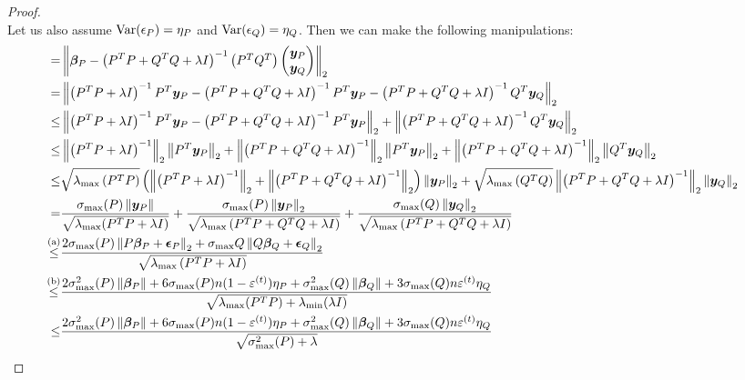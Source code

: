 \documentclass{article} %
\newcommand{\norm}[1]{\left\lVert#1\right\rVert}
\begin{document}
\begin{appendices}
\begin{proof}
\begin{equation*}
	\end{equation*}
	Let us also assume $\mathrm{Var}({\epsilon}_P) = \eta_P$ and $\mathrm{Var}({\epsilon}_Q) = \eta_Q$. Then we can make the following manipulations:
	\begin{align*}
		= &\norm{\vbeta_P - \left(P^T P + Q^T Q + \lambda I\right)^{-1}\begin{pmatrix}P^T Q^T\end{pmatrix}\begin{pmatrix}\vy_P \\ \vy_Q \end{pmatrix}}_2 &&\\
		= &\norm{\left(P^T P + \lambda I\right)^{-1} P^T \vy_P - \left(P^T P + Q^T Q + \lambda I\right)^{-1}P^T \vy_P  - \left(P^T P + Q^T Q + \lambda I\right)^{-1}Q^T \vy_Q}_2 &&\\
		\leq &\norm{\left(P^T P + \lambda I\right)^{-1} P^T \vy_P -\left(P^T P + Q^T Q+ \lambda I\right)^{-1}P^T \vy_P}_2 + \norm{\left(P^T P + Q^T Q+ \lambda I\right)^{-1}Q^T \vy_Q}_2 &&\\
		\leq& \norm{\left(P^T P + \lambda I\right)^{-1}}_2 \norm{P^T\vy_P}_2 + \norm{\left(P^T P + Q^T Q + \lambda I\right)^{-1}}_2\norm{P^T \vy_P}_2 + \norm{\left(P^T P + Q^T Q + \lambda I\right)^{-1}}_2\norm{Q^T \vy_Q}_2&&\\
		\leq & \sqrt{\lambda_{\max}\left(P^T P\right)}\left(\norm{\left(P^TP + \lambda I\right)^{-1}}_2+\norm{\left(P^T P + Q^T Q + \lambda I\right)^{-1}}_2\right)\norm{\vy_P}_2 + \sqrt{\lambda_{\max}\left(Q^T Q\right)}\norm{\left(P^T P + Q^T Q + \lambda I\right)^{-1}}_2\norm{\vy_Q}_2 &&\\
		= &\frac{\sigma_{\max}(P)\norm{\vy_P}}{\sqrt{\lambda_{\max}(P^TP + \lambda I)}} + \frac{\sigma_{\max}(P)\norm{\vy_P}_2}{\sqrt{\lambda_{\max}\left(P^T P + Q^T Q + \lambda I\right)}} + \frac{\sigma_{\max}(Q)\norm{\vy_Q}_2}{\sqrt{\lambda_{\max}\left(P^T P + Q^T Q + \lambda I\right)}} &&\\
		\overset{\mathrm{(a)}}{\leq} &\frac{2\sigma_{\max}(P)\norm{P\vbeta_P + \veps_P}_2 + \sigma_{\max}{Q}\norm{Q\vbeta_Q + \veps_Q}_2}{\sqrt{\lambda_{\max}\left(P^T P + \lambda I\right)}} &&\\
		\overset{\mathrm{(b)}}{\leq} & \frac{2\sigma^2_{\max}(P)\norm{\vbeta_P} + 6\sigma_{\max}(P)n(1-\varepsilon^{(t)})\eta_P + \sigma^2_{\max}(Q)\norm{\vbeta_Q} + 3\sigma_{\max}(Q)n\varepsilon^{(t)}\eta_Q}{\sqrt{\lambda_{\max}(P^T P) + \lambda_{\min}(\lambda I)}} &&\\
		\leq &\frac{2\sigma^2_{\max}(P)\norm{\vbeta_P} + 6\sigma_{\max}(P)n(1-\varepsilon^{(t)})\eta_P + \sigma^2_{\max}(Q)\norm{\vbeta_Q} + 3\sigma_{\max}(Q)n\varepsilon^{(t)}\eta_Q}{\sqrt{\sigma^2_{\max}(P) + \lambda}} &&\\
	\end{align*}
	

\end{proof}
\end{appendices}
\end{document}
